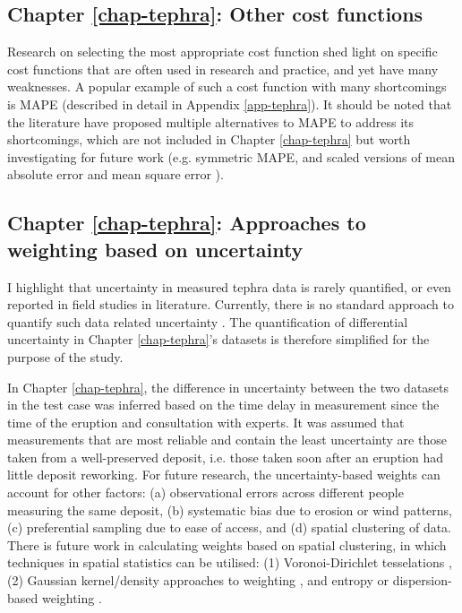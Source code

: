 \subsection{Chapter \ref{chap-tephra}: Other cost functions}
 
    Research on selecting the most appropriate cost function shed light on specific cost functions that are often used in research and practice, and yet have many weaknesses. A popular example of such a cost function with many shortcomings is MAPE (described in detail in Appendix \ref{app-tephra}). It should be noted that the literature have proposed multiple alternatives to MAPE to address its shortcomings, which are not included in Chapter \ref{chap-tephra} but worth investigating for future work (e.g. symmetric MAPE, and scaled versions of mean absolute error and mean square error \citep{hyndman2006another}).
 
\subsection{Chapter \ref{chap-tephra}: Approaches to weighting based on uncertainty}

    I highlight that uncertainty in measured tephra data is rarely quantified, or even reported in field studies in literature. Currently, there is no standard approach to quantify such data related uncertainty \citep{engwell2015}. The quantification of differential uncertainty in Chapter \ref{chap-tephra}'s datasets is therefore simplified for the purpose of the study.
    
    In Chapter \ref{chap-tephra}, the difference in uncertainty between the two datasets in the test case was inferred based on the time delay in measurement since the time of the eruption and consultation with experts. It was assumed that measurements that are most reliable and contain the least uncertainty are those taken from a well-preserved deposit, i.e. those taken soon after an eruption had little deposit reworking. For future research, the uncertainty-based weights can account for other factors: (a) observational errors across different people measuring the same deposit, (b) systematic bias due to erosion or wind patterns, (c) preferential sampling due to ease of access, and (d) spatial clustering of data. There is future work in calculating weights based on spatial clustering, in which techniques in spatial statistics can be utilised: (1) Voronoi-Dirichlet tesselations \citep{bavaud1998models}, (2) Gaussian kernel/density approaches to weighting \citep{cronie2018non, scott1992multivariate, loader2012smoothing}, and entropy or dispersion-based weighting \citep{zhu2020effectiveness}.

